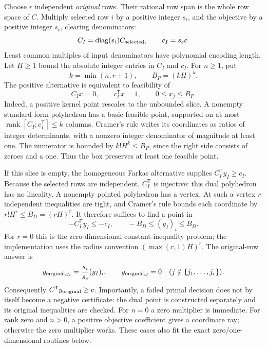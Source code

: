 Choose $r$ independent \emph{original} rows.  Their rational row span is the
whole row space of $C$.  Multiply selected row $i$ by a positive integer
$s_i$, and the objective by a positive integer $s_c$, clearing denominators:
\[
 C_I=\operatorname{diag}(s_i)C_{\rm selected},
 \qquad c_I=s_c c.
\]
Least common multiples of input denominators have polynomial encoding
length.  Let $H\ge1$ bound the absolute integer entries in $C_I$ and $c_I$.
For $n\ge1$, put
\[
 k=\min(n,r+1),\qquad B_P=(kH)^k.
\]
The positive alternative is equivalent to feasibility of
\begin{equation}
 C_Ix=0,\qquad c_I^{\mathsf T}x=1,
 \qquad 0\le x_j\le B_P.
 \label{eq:polynomial-lp-primal-box}
\end{equation}
Indeed, a positive kernel point rescales to the unbounded slice.  A nonempty
standard-form polyhedron has a basic feasible point, supported on at most
$\operatorname{rank}[C_I;c_I^{\mathsf T}]\le k$ columns.  Cramer's rule writes
its coordinates as ratios of integer determinants, with a nonzero integer
denominator of magnitude at least one.  The numerator is bounded by
$k!H^k\le B_P$, since the right side consists of zeroes and a one.  Thus the
box preserves at least one feasible point.

If this slice is empty, the homogeneous Farkas alternative supplies
$C_I^{\mathsf T}y_I\ge c_I$.  Because the selected rows are independent,
$C_I^{\mathsf T}$ is injective: this dual polyhedron has no lineality.
A nonempty pointed polyhedron has a vertex.  At such a vertex $r$ independent
inequalities are tight, and Cramer's rule bounds each coordinate by
$r!H^r\le B_D=(rH)^r$.  It therefore suffices to find a point in
\begin{equation}
 -C_I^{\mathsf T}y_I\le-c_I,
 \qquad -B_D\le (y_I)_i\le B_D.
 \label{eq:polynomial-lp-dual-box}
\end{equation}
For $r=0$ this is the zero-dimensional constant-inequality problem; the
implementation uses the radius convention $(\max(r,1)H)^r$.
The original-row answer is
\[
 y_{{\rm original},j_i}=\frac{s_i}{s_c}(y_I)_i,
 \qquad y_{{\rm original},j}=0\quad(j\notin\{j_1,\ldots,j_r\}).
\]
Consequently $C^{\mathsf T}y_{\rm original}\ge c$.  Importantly, a failed
primal decision does not by itself become a negative certificate: the dual
point is constructed separately and its original inequalities are checked.
For $n=0$ a zero multiplier is immediate.  For rank zero and $n>0$, a positive
objective coefficient gives a coordinate ray; otherwise the zero multiplier
works.  These cases also fit the exact zero/one-dimensional routines below.

